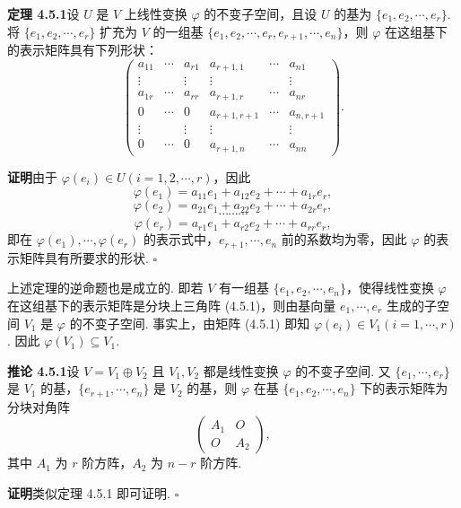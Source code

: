 \documentclass[UTF8, 12pt, fontset=fandol, oneside]{ctexart}
\begin{document}
\noindent\textbf{定理 4.5.1}\quad 设 $U$ 是 $V$ 上线性变换 $\varphi$ 的不变子空间，且设 $U$ 的基为 $\{e_1,e_2,\cdots,e_r\}$. 将 $\{e_1,e_2,\cdots,e_r\}$ 扩充为 $V$ 的一组基 $\{e_1,e_2,\cdots,e_r,e_{r+1},\cdots,e_n\}$，则 $\varphi$ 在这组基下的表示矩阵具有下列形状：
\begin{equation}
\left(\begin{array}{cccccc}
a_{11} & \cdots & a_{r1} & a_{r+1,1} & \cdots & a_{n1}\\
\vdots & & \vdots & \vdots & & \vdots\\
a_{1r} & \cdots & a_{rr} & a_{r+1,r} & \cdots & a_{nr}\\
0 & \cdots & 0 & a_{r+1,r+1} & \cdots & a_{n,r+1}\\
\vdots & & \vdots & \vdots & & \vdots\\
0 & \cdots & 0 & a_{r+1,n} & \cdots & a_{nn}
\end{array}\right).
\tag{4.5.1}
\end{equation}

\noindent\textbf{证明}\quad 由于 $\varphi(e_i)\in U(i=1,2,\cdots,r)$，因此
\[
\varphi(e_1)=a_{11}e_1+a_{12}e_2+\cdots+a_{1r}e_r,
\]
\[
\varphi(e_2)=a_{21}e_1+a_{22}e_2+\cdots+a_{2r}e_r,
\]
\[
\cdots\cdots\cdots
\]
\[
\varphi(e_r)=a_{r1}e_1+a_{r2}e_2+\cdots+a_{rr}e_r,
\]
即在 $\varphi(e_1),\cdots,\varphi(e_r)$ 的表示式中，$e_{r+1},\cdots,e_n$ 前的系数均为零，因此 $\varphi$ 的表示矩阵具有所要求的形状. $\square$

上述定理的逆命题也是成立的. 即若 $V$ 有一组基 $\{e_1,e_2,\cdots,e_n\}$，使得线性变换 $\varphi$ 在这组基下的表示矩阵是分块上三角阵 (4.5.1)，则由基向量 $e_1,\cdots,e_r$ 生成的子空间 $V_1$ 是 $\varphi$ 的不变子空间. 事实上，由矩阵 (4.5.1) 即知 $\varphi(e_i)\in V_1(i=1,\cdots,r)$. 因此 $\varphi(V_1)\subseteq V_1$.

\noindent\textbf{推论 4.5.1}\quad 设 $V=V_1\oplus V_2$ 且 $V_1,V_2$ 都是线性变换 $\varphi$ 的不变子空间. 又 $\{e_1,\cdots,e_r\}$ 是 $V_1$ 的基，$\{e_{r+1},\cdots,e_n\}$ 是 $V_2$ 的基，则 $\varphi$ 在基 $\{e_1,e_2,\cdots,e_n\}$ 下的表示矩阵为分块对角阵
\begin{equation}
\left(\begin{array}{cc}
A_1 & O\\
O & A_2
\end{array}\right),
\tag{4.5.2}
\end{equation}
其中 $A_1$ 为 $r$ 阶方阵，$A_2$ 为 $n-r$ 阶方阵.

\noindent\textbf{证明}\quad 类似定理 4.5.1 即可证明. $\square$
\end{document}
